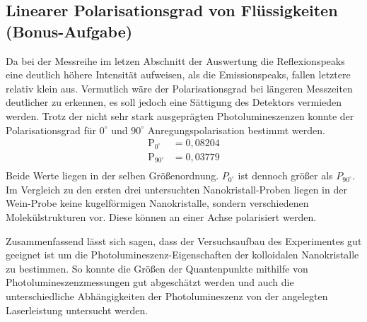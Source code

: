 \subsection{Linearer Polarisationsgrad von Flüssigkeiten (Bonus-Aufgabe)}
Da bei der Messreihe im letzen Abschnitt der Auswertung die Reflexionspeaks eine deutlich h\"{o}here Intensit\"{a}t aufweisen, als die Emissionspeaks, fallen letztere relativ klein aus.
Vermutlich w\"{a}re der Polarisationsgrad bei l\"{a}ngeren Messzeiten deutlicher zu erkennen, es soll jedoch eine S\"{a}ttigung des Detektors vermieden werden.
Trotz der nicht sehr stark ausgepr\"{a}gten Photolumineszenzen konnte der Polarisationsgrad f\"{u}r $0^{\circ}$ und $90^{\circ}$ Anregungspolarisation bestimmt werden.
\begin{align*}
	\text{P}_{0^{\circ}} &= 0,08204 \\
	\text{P}_{90^{\circ}} &= 0,03779 \\	
\end{align*}
Beide Werte liegen in der selben Gr\"{o}{\ss}enordnung.
${P}_{0^{\circ}}$ ist dennoch gr\"{o}{\ss}er als ${P}_{90^{\circ}}$.
Im Vergleich zu den ersten drei untersuchten Nanokristall-Proben liegen in der Wein-Probe keine kugelf\"{o}rmigen Nanokristalle, sondern verschiedenen Molek\"{u}lstrukturen vor.
Diese k\"{o}nnen an einer Achse polarisiert werden.

\bigskip
Zusammenfassend l\"{a}sst sich sagen, dass der Versuchsaufbau des Experimentes gut geeignet ist um die Photolumineszenz-Eigenschaften der kolloidalen Nanokristalle zu bestimmen.
So konnte die Gr\"{o}{\ss}en der Quantenpunkte mithilfe von Photolumineszenz{\-}mess{\-}un{\-}gen gut abgesch\"{a}tzt werden und auch die unterschiedliche Abhängigkeiten der Photo{\-}lumines{\-}zenz von der angelegten Laserleistung untersucht werden.


